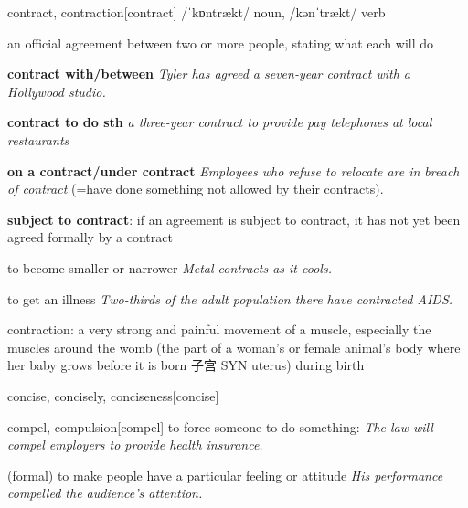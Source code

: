 \begin{DefWord}{contract, contraction}[contract]
    /ˈkɒntrækt/ noun, /kənˈtrækt/ verb

    an official agreement between two or more people, stating what each will do

    \textbf{contract with/between}
    \textit{Tyler has agreed a seven-year contract with a Hollywood studio.}

    \textbf{contract to do sth}
    \textit{a three-year contract to provide pay telephones at local restaurants}

    \textbf{on a contract/under contract}
    \textit{Employees who refuse to relocate are in breach of contract} (=have done something not allowed by their contracts).


    \textbf{subject to contract}: if an agreement is subject to contract, it has not yet been agreed formally by a contract

    to become smaller or narrower
    \textit{Metal contracts as it cools.}

    to get an illness
    \textit{Two-thirds of the adult population there have contracted AIDS.}

    contraction: a very strong and painful movement of a muscle, especially the muscles around the womb (the part of a woman's or female animal's body where her baby grows before it is born 子宫 SYN  uterus) during birth
\end{DefWord}

\begin{DefWord}{concise, concisely, conciseness}[concise] 
\end{DefWord}

\begin{DefWord}{compel,  compulsion}[compel]
    to force someone to do something:
    \textit{The law will compel employers to provide health insurance.}

    (formal) to make people have a particular feeling or attitude
    \textit{His performance compelled the audience’s attention.}
\end{DefWord}

